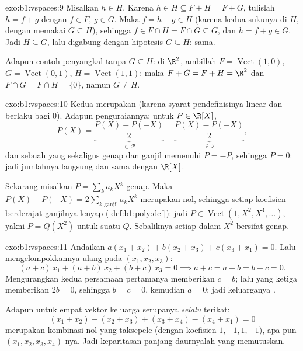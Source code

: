 \begin{solution}{exo:b1:vspaces:9}
Misalkan $h \in H$. Karena $h \in H \subseteq F + H = F + G$, tulislah $h = f
+ g$ dengan $f \in F$, $g \in G$. Maka $f = h - g \in H$ (karena kedua sukunya
di $H$, dengan memakai $G \subseteq H$), sehingga $f \in F \cap H = F \cap G
\subseteq G$, dan $h = f + g \in G$. Jadi $H \subseteq G$, lalu digabung dengan
hipotesis $G \subseteq H$: sama.

Adapun contoh penyangkal tanpa $G \subseteq H$: di $\R^2$, ambillah $F =
\operatorname{Vect}(1,0)$, $G = \operatorname{Vect}(0,1)$, $H =
\operatorname{Vect}(1,1)$: maka $F + G = F + H = \R^2$ dan $F \cap G
= F \cap H = \{0\}$, namun $G \neq H$.
\end{solution}

\begin{solution}{exo:b1:vspaces:10}
Kedua  merupakan  (karena syarat pendefinisinya linear dan
berlaku bagi $0$). Adapun penguraiannya: untuk $P \in \R[X]$,
\[
P(X) = \underbrace{\frac{P(X) + P(-X)}{2}}_{\in\,\mathcal P}
+ \underbrace{\frac{P(X) - P(-X)}{2}}_{\in\,\mathcal I},
\]
dan sebuah  yang sekaligus genap dan ganjil memenuhi $P = -P$, sehingga $P = 0$:
jadi jumlahnya langsung dan sama dengan $\R[X]$.

Sekarang misalkan $P = \sum_k a_k X^k$ genap. Maka $P(X) - P(-X) = 2
\sum_{k \text{ ganjil}} a_k X^k$ merupakan  nol, sehingga setiap
koefisien berderajat ganjilnya lenyap (\cref{def:b1:poly:def}): jadi $P \in
\operatorname{Vect}(1, X^2, X^4, \dots)$, yakni $P = Q(X^2)$ untuk suatu
 $Q$. Sebaliknya setiap  dalam $X^2$ bersifat genap.
\end{solution}

\begin{solution}{exo:b1:vspaces:11}
Andaikan $a(x_1 + x_2) + b(x_2 + x_3) + c(x_3 + x_1) = 0$.
Lalu mengelompokkannya ulang pada  $(x_1, x_2, x_3)$:
\[
(a + c)\,x_1 + (a + b)\,x_2 + (b + c)\,x_3 = 0
\implies a + c = a + b = b + c = 0 .
\]
Mengurangkan kedua persamaan pertamanya memberikan $c = b$; lalu yang ketiga
memberikan $2b = 0$, sehingga $b = c = 0$, kemudian $a = 0$: jadi keluarganya .

Adapun untuk empat vektor keluarga serupanya \emph{selalu} terikat:
\[
(x_1 + x_2) - (x_2 + x_3) + (x_3 + x_4) - (x_4 + x_1) = 0
\]
merupakan kombinasi nol yang taksepele (dengan koefisien $1, -1, 1, -1$),
apa pun $(x_1, x_2, x_3, x_4)$-nya. Jadi keparitasan panjang daurnyalah
yang memutuskan.
\end{solution}

